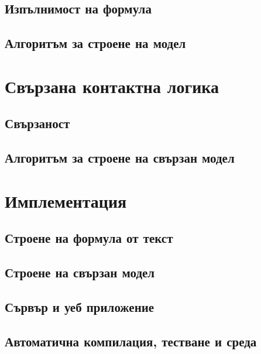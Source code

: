 \documentclass[14pt, aspectratio=169]{beamer}
\begin{document}
\subsection{Изпълнимост на формула}
\subsection{Алгоритъм за строене на модел}

\section{Свързана контактна логика}
\subsection{Свързаност}
\subsection{Алгоритъм за строене на свързан модел}

\section{Имплементация}
\subsection{Строене на формула от текст}
\subsection{Строене на свързан модел}
\subsection{Сървър и уеб приложение}
\subsection{Автоматична компилация, тестване и среда}
\end{document}
